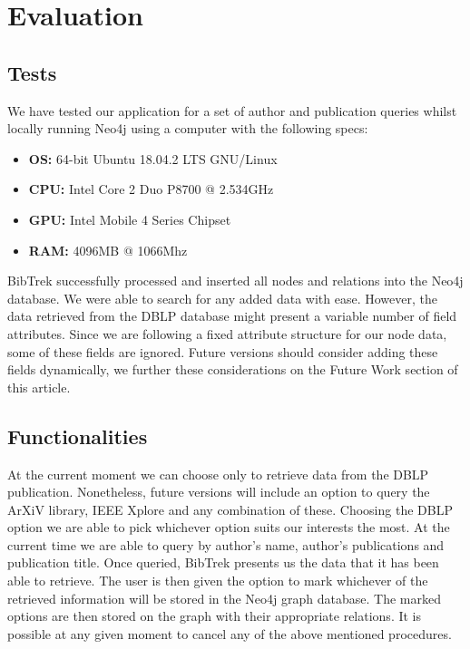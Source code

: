 \documentclass[twocolumn]{article}
\begin{document}
\section{Evaluation}
\subsection{Tests}
We have tested our application for a set of author and publication queries whilst locally running Neo4j using a computer with the following specs:
\begin{itemize}
\item \textbf{OS:} 64-bit Ubuntu 18.04.2 LTS GNU/Linux 
\item \textbf{CPU:} Intel Core 2 Duo P8700 @ 2.534GHz 
\item \textbf{GPU:} Intel Mobile 4 Series Chipset
\item \textbf{RAM:} 4096MB @ 1066Mhz 
\end{itemize}
BibTrek successfully processed and inserted all nodes and relations into the Neo4j database. We were able to search for any added data with ease. However, the data retrieved from the DBLP database might present a variable number of field attributes. Since we are following a fixed attribute structure for our node data, some of these fields are ignored. Future versions should consider adding these fields dynamically, we further these considerations on the Future Work section of this article.
\subsection{Functionalities}
At the current moment we can choose only to retrieve data from the DBLP publication. Nonetheless, future versions will include an option to query the ArXiV library, IEEE Xplore and any combination of these. Choosing the DBLP option we are able to pick whichever option suits our interests the most. At the current time we are able to query by author's name, author's publications and publication title. Once queried, BibTrek presents us the data that it has been able to retrieve. The user is then given the option to mark whichever of the retrieved information will be stored in the Neo4j graph database. The marked options are then stored on the graph with their appropriate relations. It is possible at any given moment to cancel any of the above mentioned procedures.
\end{document}
